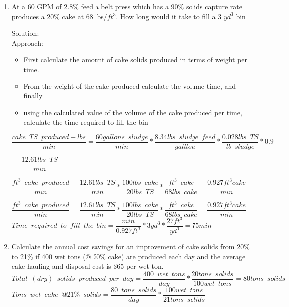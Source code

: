 \begin{enumerate}
\item At a 60 GPM of 2.8\% feed a belt press which has a 90\% solids capture rate produces a 20\% cake at 68 lbs/$ft^3$.  How long would it take to fill a 3 $yd^3$ bin  
	
	
Solution:\\
Approach:
\begin{itemize}
\item First calculate the amount of cake solids produced in terms of weight per time.
\item From the weight of the cake produced calculate the volume time, and finally
\item using the calculated value of the volume of the cake produced per time, calculate the time required to fill the bin\\
\end{itemize}

$\dfrac{cake \enspace TS \enspace produced - lbs}{min}= \dfrac {60 gallons \enspace sludge}{min}*\dfrac {8.34 lbs \enspace sludge \enspace feed}{galllon}*\dfrac{0.028 lbs \enspace TS}{lb \enspace sludge}*0.9$\\
\vspace{3mm}

$=\dfrac{12.61lbs \enspace TS}{min}$\\
\vspace{3mm}

$\dfrac{ft^3 \enspace cake \enspace produced}{min}=\dfrac{12.61lbs \enspace TS}{min}*\dfrac{100 lbs \enspace cake}{20lbs \enspace TS}*\dfrac{ft^3 \enspace cake}{68 lbs \enspace cake} = \dfrac{0.927ft^3 cake}{min}$\\
\vspace{3mm}

$\dfrac{ft^3 \enspace cake \enspace produced}{min}=\dfrac{12.61lbs \enspace TS}{min}*\dfrac{100 lbs \enspace cake}{20lbs \enspace TS}*\dfrac{ft^3 \enspace cake}{68 lbs \enspace cake} = \dfrac{0.927ft^3 cake}{min}$\\
\vspace{3mm}
$Time \enspace required \enspace to \enspace fill \enspace the \enspace bin=\dfrac{min}{0.927ft^3}*{3yd^3}*\dfrac{27ft^3}{yd^3}=\boxed{75min}$\\
\pagebreak
\item Calculate the annual cost savings for an improvement of cake solids from 20\% to 21\% if 400 wet tons (@ 20\% cake) are produced each day and the average cake hauling and disposal cost is \$65 per wet ton.\\
$Total \enspace (dry)\enspace solids \enspace produced \enspace per \enspace day =\dfrac{400 \enspace wet \enspace tons}{day}*\dfrac{20 tons \enspace solids}{100 wet \enspace tons}={80 tons \enspace solids}$\\
\vspace{3mm}
$Tons \enspace wet \enspace cake \enspace@ 21\% \enspace solids =\dfrac{80 \enspace tons \enspace solids}{day}*\dfrac{100 wet \enspace tons}{21 tons \enspace solids}$


\end{enumerate}
